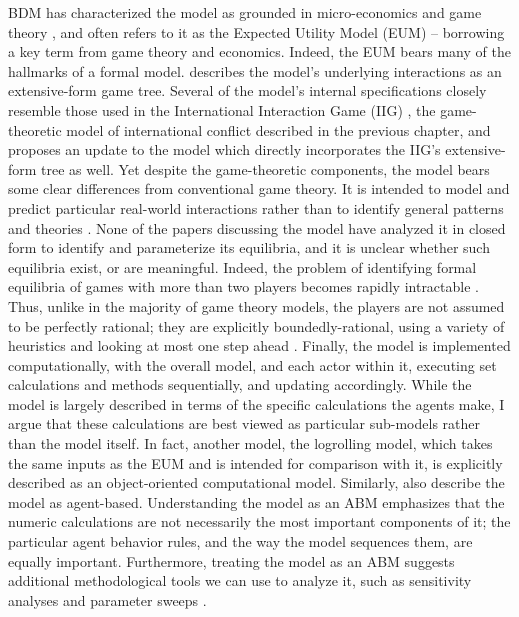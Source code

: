 BDM has characterized the model as grounded in micro-economics \citep{bdm_1994} and game theory \citep{bdm_2002,bdm_2009,bdm_2010}, and often refers to it as the Expected Utility Model (EUM) \citep{bdm_1984} -- borrowing a key term from game theory and economics. Indeed, the EUM bears many of the hallmarks of a formal model. \citet{scholz_2011} describes the model's underlying interactions as an extensive-form game tree. Several of the model's internal specifications closely resemble those used in the International Interaction Game (IIG) \citep{bdm_1992}, the game-theoretic model of international conflict described in the previous chapter, and \citet{bdm_2011} proposes an update to the model which directly incorporates the IIG's extensive-form tree as well. Yet despite the game-theoretic components, the model bears some clear differences from conventional game theory. It is intended to model and predict particular real-world interactions rather than to identify general patterns and theories \citep{snidal_1985}. None of the papers discussing the model have analyzed it in closed form to identify and parameterize its equilibria, and it is unclear whether such equilibria exist, or are meaningful. Indeed, the problem of identifying formal equilibria of games with more than two players becomes rapidly intractable \citep{papadimitriou_2005}. Thus, unlike in the majority of game theory models, the players are not assumed to be perfectly rational; they are explicitly boundedly-rational, using a variety of heuristics and looking at most one step ahead \citep{bdm_2002}. Finally, the model is implemented computationally, with the overall model, and each actor within it, executing set calculations and methods sequentially, and updating accordingly. While the model is largely described in terms of the specific calculations the agents make, I argue that these calculations are best viewed as particular sub-models rather than the model itself. In fact, another model, the \citet{stokman_1994} logrolling model, which takes the same inputs as the EUM and is intended for comparison with it, is explicitly described as an object-oriented computational model. Similarly, \citet{root_2013} also describe the model as agent-based. Understanding the model as an ABM emphasizes that the numeric calculations are not necessarily the most important components of it; the particular agent behavior rules, and the way the model sequences them, are equally important. Furthermore, treating the model as an ABM suggests additional methodological tools we can use to analyze it, such as sensitivity analyses and parameter sweeps \citep{gilbert_2005}.

